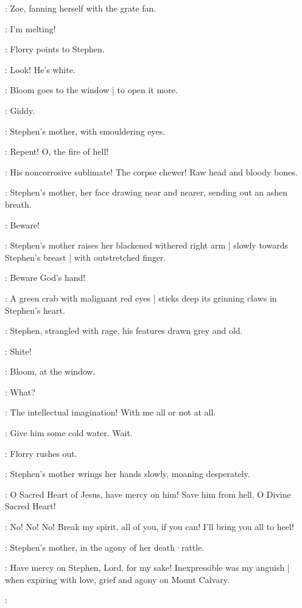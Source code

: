 :
Zoe,
fanning herself with the grate fan.

\Zoe:
I'm melting!

:
Florry points to Stephen.

\Florry:
Look!
He's white.

:
Bloom goes to the window |
to open it more.

\Bloom:
Giddy.

:
Stephen's mother,
with smouldering eyes.

\Mother:
Repent!
O,
the fire of hell!

\Stephen:
His noncorrosive sublimate!
The corpse chewer!
Raw head and bloody bones.

:
Stephen's mother,
her face drawing near and nearer,
sending out an ashen breath.

\Mother:
Beware!

:
Stephen's mother raises her blackened withered right arm |
slowly towards Stephen's breast |
with outstretched finger.

\Mother:
Beware God's hand!

:
A green crab with malignant red eyes |
%
sticks deep its grinning claws in Stephen's heart.

:
Stephen,
strangled with rage,
his features drawn grey and old.

\Stephen:
Shite!

:
Bloom,
at the window.

\Bloom:
What?

\Stephen:
The intellectual imagination!
With me all or not at all.

\Florry:
Give him some cold water.
Wait.

:
Florry rushes out.

:
Stephen's mother wrings her hands slowly,
moaning desperately.

\Mother:
O Sacred Heart of Jesus,
have mercy on him!
Save him from hell,
O Divine Sacred Heart!

\Stephen:
No! No! No!
Break my spirit,
all of you,
if you can!
I'll bring you all to heel!

:
Stephen's mother,
in the agony of her death·rattle.

\Mother:
Have mercy on Stephen,
Lord,
for my sake!
Inexpressible was my anguish |
when expiring with love,
grief and agony
%
on Mount Calvary.

\Stephen:

